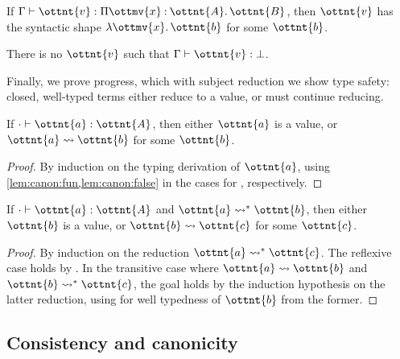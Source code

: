 \documentclass[a4paper,UKenglish,cleveref,autoref,thm-restate]{lipics-v2021}
\begin{document}
\begin{lemma} \label{lem:canon:fun}
  If $ \Gamma  \vdash  \ottnt{v}  \mathrel{:}   \Pi  \ottmv{x}  \mathbin{:}  \ottnt{A}  \mathpunct{.}  \ottnt{B}  $,
  then $\ottnt{v}$ has the syntactic shape $ \lambda  \ottmv{x}  \mathpunct{.}  \ottnt{b} $ for some $\ottnt{b}$.
\end{lemma}

\begin{lemma} \label{lem:canon:false}
  There is no $\ottnt{v}$ such that $ \Gamma  \vdash  \ottnt{v}  \mathrel{:}   \bot  $.
\end{lemma}

Finally, we prove progress, which with subject reduction we show type safety:
closed, well-typed terms either reduce to a value, or must continue reducing.

\begin{theorem}[Progress] \label{lem:progress}
  If $  \cdot   \vdash  \ottnt{a}  \mathrel{:}  \ottnt{A} $, then either $\ottnt{a}$ is a value,
  or $ \ottnt{a}  \rightsquigarrow  \ottnt{b} $ for some $\ottnt{b}$.
\end{theorem}

\begin{proof}
  By induction on the typing derivation of $\ottnt{a}$,
  using \cref{lem:canon:fun,lem:canon:false}
  in the cases for , respectively.
\end{proof}

\begin{theorem}
  If $  \cdot   \vdash  \ottnt{a}  \mathrel{:}  \ottnt{A} $ and $ \ottnt{a}  \rightsquigarrow^\ast  \ottnt{b} $,
  then either $\ottnt{b}$ is a value,
  or $ \ottnt{b}  \rightsquigarrow  \ottnt{c} $ for some $\ottnt{c}$.
\end{theorem}

\begin{proof}
  By induction on the reduction $ \ottnt{a}  \rightsquigarrow^\ast  \ottnt{c} $.
  The reflexive case holds by .
  In the transitive case where $ \ottnt{a}  \rightsquigarrow  \ottnt{b} $ and $ \ottnt{b}  \rightsquigarrow^\ast  \ottnt{c} $,
  the goal holds by the induction hypothesis on the latter reduction,
  using  for well typedness of $\ottnt{b}$
  from the former.
\end{proof}

\subsection{Consistency and canonicity}
\end{document}
